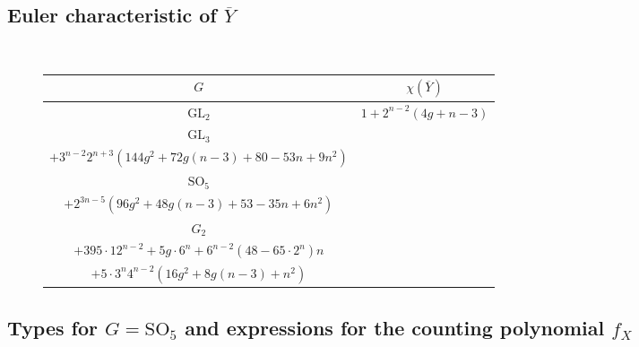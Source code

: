 \documentclass[12pt]{amsart}
\theoremstyle{plain}
\theoremstyle{definition}
\theoremstyle{remark}
\newcommand{\bY}{{Y}}
\newcommand{\GL}{\mathrm{GL}}
\newcommand{\SO}{\mathrm{SO}}
\begin{document}
\subsection{Euler characteristic of $\overline{\bY}$} \label{s:EulerY}
\mbox{}\\
\begin{figure}[h]
\centering
\begin{tabular}{|c|c|} 
\hline 
$G$ & $\chi(\overline{Y})$ \\
\hline 
$\GL_2$ & $1+2^{n-2}(4g+n-3)$ \\
\hline
$\GL_3$ & \makecell{$1+2\cdot 3^{n-1}(3g+n-3)$ \\ $+3^{n-2}2^{n+3}(144g^2+72g(n-3)  +80 -53n + 9n^2)$} \\
\hline
$\SO_5$ & \makecell{$1+2^{n-2} + 2^{2n-3}(24g+7n-22)$ \\ $+ 2^{3n-5}(96g^2 + 48g(n-3) + 53 -35n + 6n^2)$} \\
\hline
$G_2$ & \makecell{$\frac{1}{6}(6-2^n + 19\cdot 3^{n+1} + 5^n)$ \\ $+395\cdot 12^{n-2} + 5g \cdot 6^n +6^{n-2}(48-65\cdot 2^n)n$ \\ $+5\cdot 3^n4^{n-2}(16g^2 + 8g(n-3) + n^2)$} \\
\hline 
\end{tabular}
\end{figure}


\newpage 

\subsection{Types for $G=\mathrm{SO}_5$ and expressions for the counting polynomial $f_X$} \ 
\end{document}
